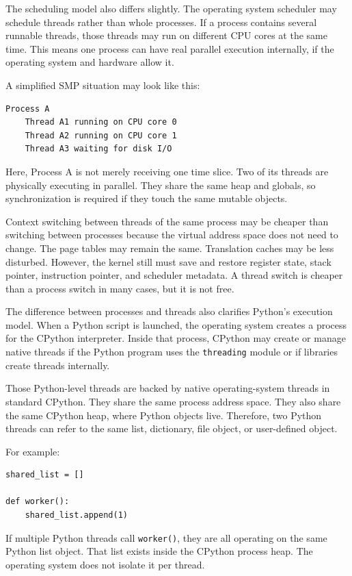 The scheduling model also differs slightly. The operating system scheduler may schedule threads rather than whole processes. If a process contains several runnable threads, those threads may run on different CPU cores at the same time. This means one process can have real parallel execution internally, if the operating system and hardware allow it.

A simplified SMP situation may look like this:

\begin{verbatim}
Process A
    Thread A1 running on CPU core 0
    Thread A2 running on CPU core 1
    Thread A3 waiting for disk I/O
\end{verbatim}

Here, Process A is not merely receiving one time slice. Two of its threads are physically executing in parallel. They share the same heap and globals, so synchronization is required if they touch the same mutable objects.

Context switching between threads of the same process may be cheaper than switching between processes because the virtual address space does not need to change. The page tables may remain the same. Translation caches may be less disturbed. However, the kernel still must save and restore register state, stack pointer, instruction pointer, and scheduler metadata. A thread switch is cheaper than a process switch in many cases, but it is not free.

The difference between processes and threads also clarifies Python's execution model. When a Python script is launched, the operating system creates a process for the CPython interpreter. Inside that process, CPython may create or manage native threads if the Python program uses the \texttt{threading} module or if libraries create threads internally.

Those Python-level threads are backed by native operating-system threads in standard CPython. They share the same process address space. They also share the same CPython heap, where Python objects live. Therefore, two Python threads can refer to the same list, dictionary, file object, or user-defined object.

For example:

\begin{verbatim}
shared_list = []

def worker():
    shared_list.append(1)
\end{verbatim}

If multiple Python threads call \texttt{worker()}, they are all operating on the same Python list object. That list exists inside the CPython process heap. The operating system does not isolate it per thread.

